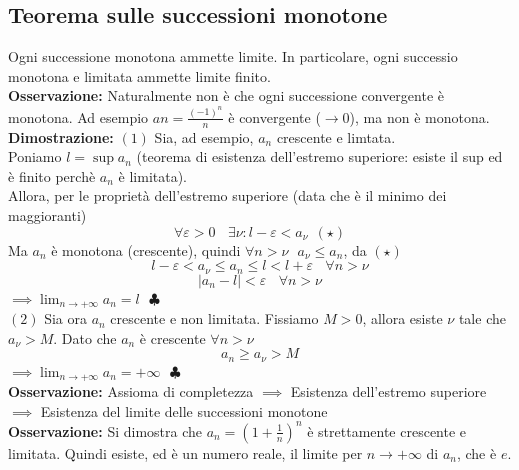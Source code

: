 \documentclass{article}
\begin{document}
\subsection{Teorema sulle successioni monotone}
Ogni successione monotona ammette limite. In particolare, ogni successio
monotona e limitata ammette limite finito.\\ \textbf{Osservazione:}
Naturalmente non è che ogni successione convergente è monotona. Ad esempio $an
    = \frac{(-1)^n}{n}$ è convergente ($\to 0$), ma non è monotona.\\
\textbf{Dimostrazione:} $(1)$ Sia, ad esempio, $a_n$ crescente e limtata.\\
Poniamo $l = \sup a_n$ (teorema di esistenza dell'estremo superiore: esiste il
sup ed è finito perchè $a_n$ è limitata).\\ Allora, per le proprietà
dell'estremo superiore (data che è il minimo dei maggioranti)
\[
    \forall\varepsilon>0 \ \ \ \ \exists \nu : l-\varepsilon < a_\nu \ \ (\star)
\]
Ma $a_n$ è monotona (crescente), quindi $\forall n>\nu \ \ \ a_\nu \leq a_n$,
da $(\star)$
\[
    l-\varepsilon < a_\nu \leq a_n \leq l < l+\varepsilon \ \ \ \ \forall n > \nu
\]
\[
    |a_n - l| < \varepsilon \ \ \ \ \forall n > \nu
\]
$\implies \lim_{n\to+\infty}a_n = l \ \ \ \clubsuit$\\
$(2)$ Sia ora $a_n$ crescente e non limitata. Fissiamo $M > 0$, allora esiste $\nu$ tale che $a_\nu > M$. Dato che $a_n$ è crescente $\forall n>\nu$
\[
    a_n \geq a_\nu > M
\]
$\implies \lim_{n\to+\infty}a_n = +\infty \ \ \ \clubsuit$\\
\textbf{Osservazione:} Assioma di completezza $\implies$ Esistenza dell'estremo superiore $\implies$ Esistenza del limite delle successioni monotone\\
\textbf{Osservazione:} Si dimostra che $a_n = (1+\frac{1}{n})^n$ è strettamente crescente e limitata. Quindi esiste, ed è un numero reale, il limite per $n\to+\infty$ di $a_n$, che è $e$.
\end{document}
